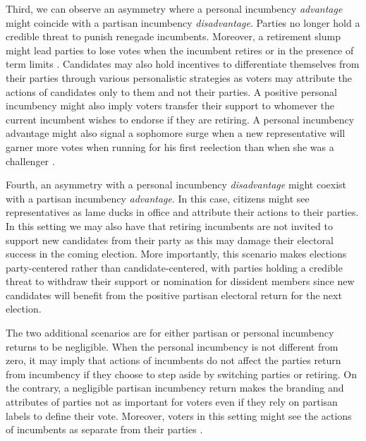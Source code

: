 \documentclass[12pt]{amsart}
\numberwithin{equation}{section}
\theoremstyle{definition}
\theoremstyle{definition}
\theoremstyle{definition}
\begin{document}
 Third, we can observe an asymmetry where a personal incumbency \emph{advantage} might coincide with a partisan incumbency \emph{disadvantage}. Parties no longer hold a credible threat to punish renegade incumbents. Moreover, a retirement slump might lead parties to lose votes when the incumbent retires \citep{alford_brady_1989} or in the presence of term limits \citep{ansolabehere_snyder_2004}. Candidates may also hold incentives to differentiate themselves from their parties through various personalistic strategies as voters may attribute the actions of candidates only to them and not their parties. A positive personal incumbency might also imply voters transfer their support to whomever the current incumbent wishes to endorse if they are retiring. A personal incumbency advantage might also signal a sophomore surge when a new representative will garner more votes when running for his first reelection than when she was a challenger \citep{erikson_1971, alford_brady_1989}. 
  
 
 Fourth, an asymmetry with a personal incumbency \emph{disadvantage} might coexist with a partisan incumbency \emph{advantage}. In this case, citizens might see representatives as lame ducks in office and attribute their actions to their parties. In this setting we may also have that retiring incumbents are not invited to support new candidates from their party as this may damage their electoral success in the coming election. More importantly, this scenario makes elections party-centered rather than candidate-centered, with parties holding a credible threat to withdraw their support or nomination for dissident members since new candidates will benefit from the positive partisan electoral return for the next election.  

The two additional scenarios are for either partisan or personal incumbency returns to be negligible. When the personal incumbency is not different from zero, it may imply that actions of incumbents do not affect the parties return from incumbency if they choose to step aside by switching parties or retiring. On the contrary, a negligible partisan incumbency return makes the branding and attributes of parties not as important for voters even if they rely on partisan labels to define their vote. Moreover, voters in this setting might see the actions of incumbents as separate from their parties \citep{fowler_hall_2014}. 
\end{document}
